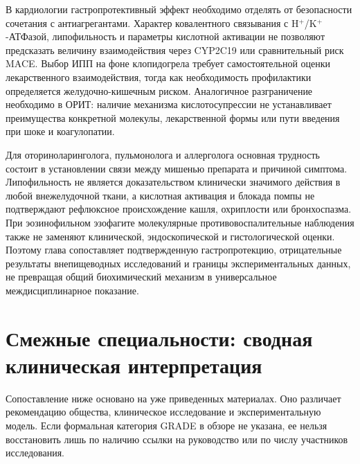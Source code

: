 \documentclass[11pt,a4paper,notitlepage]{report}
\newcommand{\src}[1]{\unskip\space\cite{#1}}
\begin{document}
В кардиологии гастропротективный эффект необходимо отделять от безопасности сочетания с антиагрегантами. Характер ковалентного связывания с H$^+$/K$^+$-АТФазой, липофильность и параметры кислотной активации не позволяют предсказать величину взаимодействия через CYP2C19 или сравнительный риск MACE. Выбор ИПП на фоне клопидогрела требует самостоятельной оценки лекарственного взаимодействия, тогда как необходимость профилактики определяется желудочно-кишечным риском. Аналогичное разграничение необходимо в ОРИТ: наличие механизма кислотосупрессии не устанавливает преимущества конкретной молекулы, лекарственной формы или пути введения при шоке и коагулопатии.\src{sps,molcypinhib,sccm}

Для оториноларинголога, пульмонолога и аллерголога основная трудность состоит в установлении связи между мишенью препарата и причиной симптома. Липофильность не является доказательством клинически значимого действия в любой внежелудочной ткани, а кислотная активация и блокада помпы не подтверждают рефлюксное происхождение кашля, охриплости или бронхоспазма. При эозинофильном эзофагите молекулярные противовоспалительные наблюдения также не заменяют клинической, эндоскопической и гистологической оценки. Поэтому глава сопоставляет подтвержденную гастропротекцию, отрицательные результаты внепищеводных исследований и границы экспериментальных данных, не превращая общий биохимический механизм в универсальное междисциплинарное показание.\src{toppits,asthma,eoe,molnrf2,molil8}

\section{Смежные специальности: сводная клиническая интерпретация}
\label{sec:interdisciplinary}
Сопоставление ниже основано на уже приведенных материалах. Оно различает рекомендацию общества, клиническое исследование и экспериментальную модель. Если формальная категория GRADE в обзоре не указана, ее нельзя восстановить лишь по наличию ссылки на руководство или по числу участников исследования.
\end{document}

